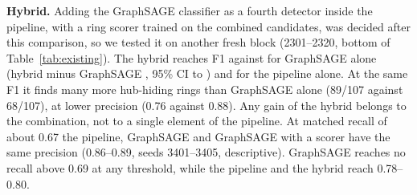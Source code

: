 \textbf{Hybrid.} Adding the GraphSAGE classifier as a fourth detector inside the
pipeline, with a ring scorer trained on the combined candidates, was decided
after this comparison, so we tested it on another fresh block (2301--2320,
bottom of Table~\ref{tab:existing}). The hybrid reaches F1 \RfHyhybridF{}
against \RfHygnnunscoredF{} for GraphSAGE alone (hybrid minus GraphSAGE
\RfHygnnunscoredD{}, 95\% CI \RfHygnnunscoredLo{} to \RfHygnnunscoredHi{}) and
\RfHyproposedF{} for the pipeline alone. At the same F1 it finds many more
hub-hiding rings than GraphSAGE alone (89/107 against 68/107), at lower
precision (0.76 against 0.88). Any gain of the hybrid belongs to the
combination, not to a single element of the pipeline. At matched recall of about
0.67 the pipeline, GraphSAGE and GraphSAGE with a scorer have the same precision
(0.86--0.89, seeds 3401--3405, descriptive). GraphSAGE reaches no recall above
0.69 at any threshold, while the pipeline and the hybrid reach 0.78--0.80.

